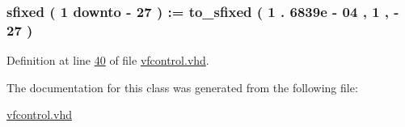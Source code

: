 \subsubsection[{mstep}]{ {\bfseries \textcolor{comment}{sfixed}\textcolor{vhdlchar}{ }\textcolor{vhdlchar}{(}\textcolor{vhdlchar}{ }\textcolor{vhdlchar}{ } \textcolor{vhdldigit}{1} \textcolor{vhdlchar}{ }\textcolor{keywordflow}{downto}\textcolor{vhdlchar}{ }\textcolor{vhdlchar}{-\/}\textcolor{vhdlchar}{ } \textcolor{vhdldigit}{27} \textcolor{vhdlchar}{ }\textcolor{vhdlchar}{)}\textcolor{vhdlchar}{ }\textcolor{vhdlchar}{ }\textcolor{vhdlchar}{ }\textcolor{vhdlchar}{\+:}\textcolor{vhdlchar}{=}\textcolor{vhdlchar}{ }\textcolor{vhdlchar}{ }\textcolor{vhdlchar}{ }\textcolor{vhdlchar}{ }\textcolor{vhdlchar}{to\+\_\+sfixed}\textcolor{vhdlchar}{ }\textcolor{vhdlchar}{(}\textcolor{vhdlchar}{ }\textcolor{vhdlchar}{ } \textcolor{vhdldigit}{1} \textcolor{vhdlchar}{.} \textcolor{vhdldigit}{6839e} \textcolor{vhdlchar}{-\/} \textcolor{vhdldigit}{04} \textcolor{vhdlchar}{ }\textcolor{vhdlchar}{,}\textcolor{vhdlchar}{ }\textcolor{vhdlchar}{ } \textcolor{vhdldigit}{1} \textcolor{vhdlchar}{ }\textcolor{vhdlchar}{,}\textcolor{vhdlchar}{ }\textcolor{vhdlchar}{-\/}\textcolor{vhdlchar}{ } \textcolor{vhdldigit}{27} \textcolor{vhdlchar}{ }\textcolor{vhdlchar}{)}\textcolor{vhdlchar}{ }} \hspace{0.3cm}{\ttfamily [Signal]}}\label{classvfcontrol_1_1vfcontrol__arch_a3d5f05a872732b773487db45eaac7e4f}


Definition at line \hyperlink{vfcontrol_8vhd_source_l00040}{40} of file \hyperlink{vfcontrol_8vhd_source}{vfcontrol.\+vhd}.



The documentation for this class was generated from the following file\+:\begin{DoxyCompactItemize}
\item 
\hyperlink{vfcontrol_8vhd}{vfcontrol.\+vhd}\end{DoxyCompactItemize}

